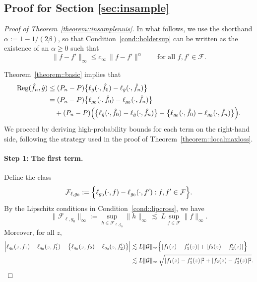 \documentclass[11pt]{article}
\newcommand{\Reg}{\mathrm{Reg}}
\theoremstyle{plain}
\theoremstyle{definition} %
\begin{document}
\subsection{Proof for Section \ref{sec:insample}}
 
 
\begin{proof}[Proof of Theorem~\ref{theorem::insamplenuis}]
In what follows, we use the shorthand $\alpha := 1 - 1/(2\beta)$, so that Condition~\ref{cond::holdersup} can be written as the existence of an $\alpha\ge 0$ such that
\[
\|f-f'\|_\infty \le c_{\infty}\,\|f-f'\|^{\alpha}
\qquad\text{for all } f,f'\in\mathcal F.
\]


Theorem~\ref{theorem::basic} implies that
\begin{equation}
\label{eqn::basicnuis}
\begin{aligned}
\Reg(\hat f_n, \hat g)
&\le (P_n-P)\bigl\{\ell_{\hat g}(\cdot,\hat f_0)-\ell_{\hat g}(\cdot,\hat f_n)\bigr\} \\
&=
(P_n-P)\bigl\{\ell_{g_0}(\cdot,\hat f_0)-\ell_{g_0}(\cdot,\hat f_n)\bigr\}\\
&\quad + (P_n-P)\Bigl(\bigl\{\ell_{\hat g}(\cdot,\hat f_0)-\ell_{\hat g}(\cdot,\hat f_n)\bigr\}
-\bigl\{\ell_{g_0}(\cdot,\hat f_0)-\ell_{g_0}(\cdot,\hat f_n)\bigr\}\Bigr).
\end{aligned}
\end{equation}
We proceed by deriving high-probability bounds for each term on the right-hand side, following the strategy used in the proof of Theorem~\ref{theorem::localmaxloss}.

\paragraph{Step 1: The first term.}
Define the class
\[
\mathcal{F}_{\ell,g_0}
:=
\Bigl\{\ell_{g_0}(\cdot,f)-\ell_{g_0}(\cdot,f') : f,f'\in\mathcal F\Bigr\}.
\]
By the Lipschitz conditions in Condition~\ref{cond::lipcross}, we have
\[
\|\mathcal{F}_{\ell,g_0}\|_{\infty}
:= \sup_{h \in \mathcal{F}_{\ell,g_0}}\|h\|_{\infty}
\ \lesssim\ L \sup_{f \in \mathcal{F}}\|f\|_{\infty}.
\]
Moreover, for all $z$,
\begin{align*}
\Bigl|
\ell_{g_0}(z,f_1)-\ell_{g_0}(z,f_1')
-
\bigl\{\ell_{g_0}(z,f_2)-\ell_{g_0}(z,f_2')\bigr\}
\Bigr|
&\lesssim
L \|\mathcal{G}\|_{\infty} \Bigl\{|f_1(z)-f_1'(z)|+|f_2(z)-f_2'(z)|\Bigr\}\\
&\lesssim
L\|\mathcal{G}\|_{\infty}\,
\sqrt{|f_1(z)-f_1'(z)|^2+|f_2(z)-f_2'(z)|^2}.
\end{align*}


\end{proof}
\end{document}
